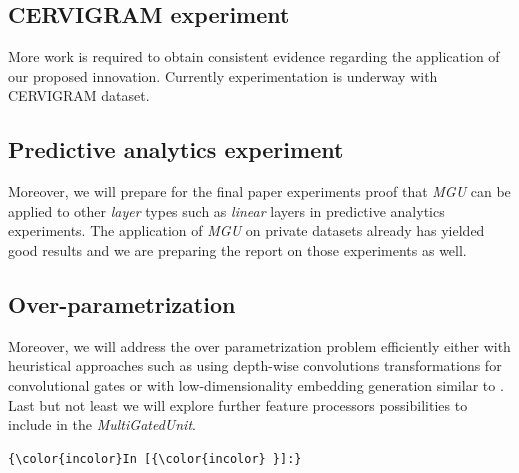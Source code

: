 \documentclass[11pt]{article}
\begin{document}
\hypertarget{cervigram-experiment}{%
\subsection{CERVIGRAM experiment}\label{cervigram-experiment}}

More work is required to obtain consistent evidence regarding the
application of our proposed innovation. Currently experimentation is
underway with CERVIGRAM dataset.

\hypertarget{predictive-analytics-experiment}{%
\subsection{Predictive analytics
experiment}\label{predictive-analytics-experiment}}

Moreover, we will prepare for the final paper experiments proof that
\emph{MGU} can be applied to other \emph{layer} types such as
\emph{linear} layers in predictive analytics experiments. The
application of \emph{MGU} on private datasets already has yielded good
results and we are preparing the report on those experiments as well.

\hypertarget{over-parametrization}{%
\subsection{Over-parametrization}\label{over-parametrization}}

Moreover, we will address the over parametrization problem efficiently
either with heuristical approaches such as using depth-wise convolutions
transformations for convolutional gates or with low-dimensionality
embedding generation similar to \cite{hu2019squeezeandexcitation}. Last
but not least we will explore further feature processors possibilities
to include in the \emph{MultiGatedUnit}.

		\begin{Verbatim}[commandchars=\\\{\},fontsize=\scriptsize]
{\color{incolor}In [{\color{incolor} }]:} 
\end{Verbatim}


    
    



    
\end{document}
